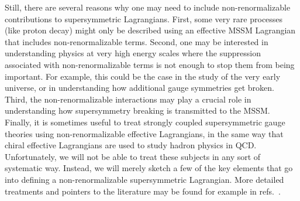 \documentclass[12pt]{article}
\begin{document}
Still, there are several reasons why one may need to include 
non-renormalizable contributions to supersymmetric Lagrangians. First, 
some very rare processes (like proton decay) might only be described using 
an effective MSSM Lagrangian that includes non-renormalizable terms. 
Second, one may be interested in understanding physics at very high 
energy scales where the suppression associated with non-renormalizable 
terms is not enough to stop them from being important. For example, this 
could be the case in the study of the very early universe, or in 
understanding how additional gauge symmetries get broken. Third, the 
non-renormalizable interactions may play a crucial role in understanding 
how supersymmetry breaking is transmitted to the MSSM. Finally, it is 
sometimes useful to treat strongly coupled supersymmetric gauge theories 
using non-renormalizable effective Lagrangians, in the same way that 
chiral effective Lagrangians are used to study hadron physics in QCD. 
Unfortunately, we will not be able to treat these subjects in any sort of 
systematic way. Instead, we will merely sketch a few of the key elements 
that go into defining a non-renormalizable supersymmetric Lagrangian. 
More detailed treatments and pointers to the literature may be found for example in 
refs.~\cite{WessBaggerbook,Westbook,BailinLovebook,Buchbinder:1998qv,
Weinbergbook,Freedman:2012zz,Shifman:2012zz,Nillesreview,GGRS,VNreview,Bertolini:2013via}.
\end{document}
